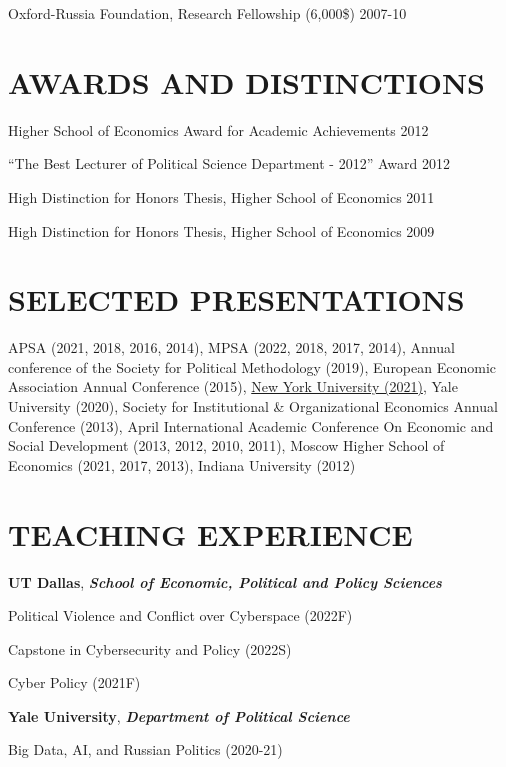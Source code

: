 \documentclass[11pt,]{article}
\begin{document}
Oxford-Russia Foundation, Research Fellowship (6,000\$) \hfill  2007-10

\hypertarget{awards-and-distinctions}{%
\section{AWARDS AND DISTINCTIONS}\label{awards-and-distinctions}}

Higher School of Economics Award for Academic Achievements \hfill 2012

``The Best Lecturer of Political Science Department - 2012'' Award
\hfill 2012

High Distinction for Honors Thesis, Higher School of Economics
\hfill  2011

High Distinction for Honors Thesis, Higher School of Economics
\hfill  2009

\hypertarget{selected-presentations}{%
\section{SELECTED PRESENTATIONS}\label{selected-presentations}}

APSA (2021, 2018, 2016, 2014), MPSA (2022, 2018, 2017, 2014), Annual
conference of the Society for Political Methodology (2019), European
Economic Association Annual Conference (2015),
\href{https://www.youtube.com/watch?v=6_3E39SH688}{New York University
(2021)}, Yale University (2020), Society for Institutional \&
Organizational Economics Annual Conference (2013), April International
Academic Conference On Economic and Social Development (2013, 2012,
2010, 2011), Moscow Higher School of Economics (2021, 2017, 2013),
Indiana University (2012)

\hypertarget{teaching-experience}{%
\section{TEACHING EXPERIENCE}\label{teaching-experience}}

\textbf{UT Dallas}, \textbf{\emph{School of Economic, Political and
Policy Sciences}}

\hskip 1cm Political Violence and Conflict over Cyberspace (2022F)

\hskip 1cm Capstone in Cybersecurity and Policy (2022S)

\hskip 1cm Cyber Policy (2021F)

\textbf{Yale University}, \textbf{\emph{Department of Political
Science}}

\hskip 1cm Big Data, AI, and Russian Politics (2020-21)
\end{document}

